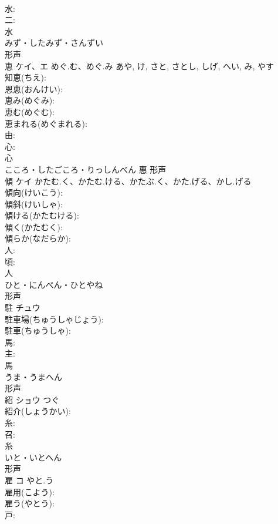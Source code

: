 \documentclass[8pt]{extreport}
\begin{document}
\begin{CJK}{UTF8}{min}
\\	水: 
\\	二: 
\\	水	
\\	みず・したみず・さんずい	
\\	形声 
\\	恵	ケイ、エ	めぐ.む、めぐ.み	あや, け, さと, さとし, しげ, へい, み, やす	
\\	知恵(ちえ): 
\\	恩恵(おんけい): 
\\	恵み(めぐみ): 
\\	恵む(めぐむ): 
\\	恵まれる(めぐまれる): 
\\	由: 
\\	心: 
\\	心	
\\	こころ・したごころ・りっしんべん	惠	形声 
\\	傾	ケイ	かたむ.く、かたむ.ける、かたぶ.く、かた.げる、かし.げる		
\\	傾向(けいこう): 
\\	傾斜(けいしゃ): 
\\	傾ける(かたむける): 
\\	傾く(かたむく): 
\\	傾らか(なだらか): 
\\	人: 
\\	頃: 
\\	人	
\\	ひと・にんべん・ひとやね	
\\	形声 
\\	駐	チュウ			
\\	駐車場(ちゅうしゃじょう): 
\\	駐車(ちゅうしゃ): 
\\	馬: 
\\	主: 
\\	馬	
\\	うま・うまへん	
\\	形声 
\\	紹	ショウ		つぐ	
\\	紹介(しょうかい): 
\\	糸: 
\\	召: 
\\	糸	
\\	いと・いとへん	
\\	形声 
\\	雇	コ	やと.う		
\\	雇用(こよう): 
\\	雇う(やとう): 
\\	戸: 

\end{CJK}
\end{document}
